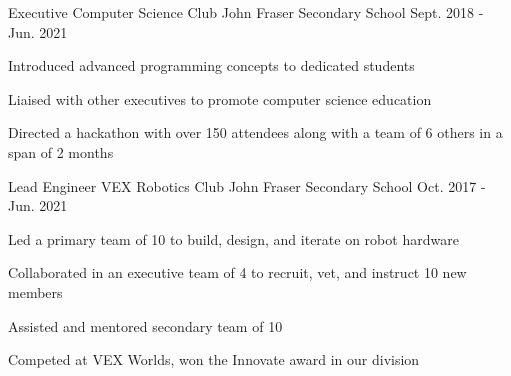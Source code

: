 

\begin{cventries}

  \cventry
    {Executive} %
    {Computer Science Club} %
    {John Fraser Secondary School} %
    {Sept. 2018 - Jun. 2021} %
    {
      \begin{cvitems} %
		\item {Introduced advanced programming concepts to dedicated students}
		\item {Liaised with other executives to promote computer science education}
		\item {Directed a hackathon with over 150 attendees along with a team of 6 others in a span of 2 months}
      \end{cvitems}
    }

  \cventry
    {Lead Engineer} %
    {VEX Robotics Club} %
    {John Fraser Secondary School} %
    {Oct. 2017 - Jun. 2021} %
    {
      \begin{cvitems} %
        \item {Led a primary team of 10 to build, design, and iterate on robot hardware}
        \item {Collaborated in an executive team of 4 to recruit, vet, and instruct 10 new members}
		\item {Assisted and mentored secondary team of 10}
	    \item {Competed at VEX Worlds, won the Innovate award in our division}
      \end{cvitems}
    }

\end{cventries}
